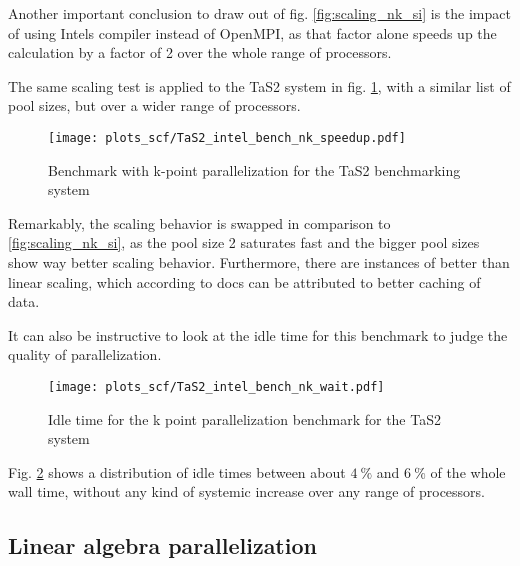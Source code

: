 \documentclass[main.tex]{subfiles}
\begin{document}
Another important conclusion to draw out of fig. \ref{fig:scaling_nk_si} is the impact of using Intels compiler instead of OpenMPI, as that factor alone speeds up the calculation by a factor of 2 over the whole range of processors.

The same scaling test is applied to the TaS2 system in fig. \ref{fig:scaling_nk_tas2}, with a similar list of pool sizes, but over a wider range of processors.

\begin{figure}[ht!]
    \centering
    \texttt{[image: plots\_scf/TaS2\_intel\_bench\_nk\_speedup.pdf]}
    \caption{Benchmark with k-point parallelization for the TaS2 benchmarking system}
    \label{fig:scaling_nk_tas2}
\end{figure}

Remarkably, the scaling behavior is swapped in comparison to \ref{fig:scaling_nk_si}, as the pool size 2 saturates fast and the bigger pool sizes show way better scaling behavior.
Furthermore, there are instances of better than linear scaling, which according to \QE docs can be attributed to better caching of data.

It can also be instructive to look at the idle time for this benchmark to judge the quality of parallelization. 

\begin{figure}[ht!]
    \centering
    \texttt{[image: plots\_scf/TaS2\_intel\_bench\_nk\_wait.pdf]}
    \caption{Idle time for the k point parallelization benchmark for the TaS2 system}
    \label{fig:scaling_nk_tas2_wait}
\end{figure}

Fig. \ref{fig:scaling_nk_tas2_wait} shows a distribution of idle times between about \(\SI{4}{\percent}\) and \(\SI{6}{\percent}\) of the whole wall time, without any kind of systemic increase over any range of processors.

\subsection{Linear algebra parallelization}

\end{document}
